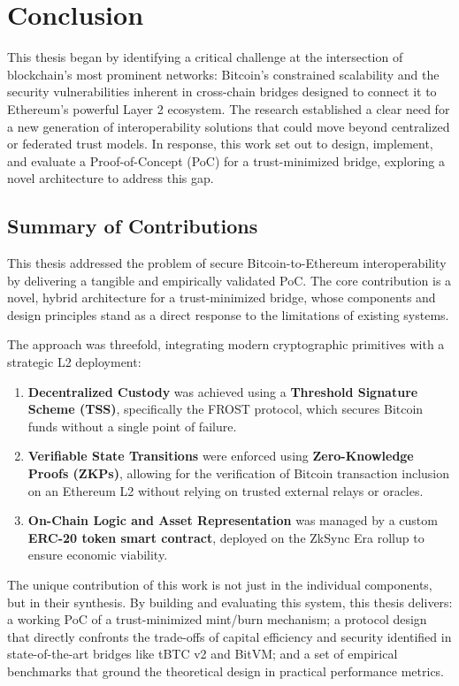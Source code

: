 \documentclass{DESSThesis}
\begin{document}
\chapter{Conclusion} \label{chap:conclusion}
\thispagestyle{empty}

This thesis began by identifying a critical challenge at the intersection of blockchain's most prominent networks: Bitcoin's constrained scalability and the security vulnerabilities inherent in cross-chain bridges designed to connect it to Ethereum's powerful Layer 2 ecosystem. The research established a clear need for a new generation of interoperability solutions that could move beyond centralized or federated trust models. In response, this work set out to design, implement, and evaluate a Proof-of-Concept (PoC) for a trust-minimized bridge, exploring a novel architecture to address this gap.

\section{Summary of Contributions}

This thesis addressed the problem of secure Bitcoin-to-Ethereum interoperability by delivering a tangible and empirically validated PoC. The core contribution is a novel, hybrid architecture for a trust-minimized bridge, whose components and design principles stand as a direct response to the limitations of existing systems.

The approach was threefold, integrating modern cryptographic primitives with a strategic L2 deployment:
\begin{enumerate}
    \item \textbf{Decentralized Custody} was achieved using a \textbf{Threshold Signature Scheme (TSS)}, specifically the FROST protocol, which secures Bitcoin funds without a single point of failure.
    \item \textbf{Verifiable State Transitions} were enforced using \textbf{Zero-Knowledge Proofs (ZKPs)}, allowing for the verification of Bitcoin transaction inclusion on an Ethereum L2 without relying on trusted external relays or oracles.
    \item \textbf{On-Chain Logic and Asset Representation} was managed by a custom \textbf{ERC-20 token smart contract}, deployed on the ZkSync Era rollup to ensure economic viability.
\end{enumerate}

The unique contribution of this work is not just in the individual components, but in their synthesis. By building and evaluating this system, this thesis delivers: a working PoC of a trust-minimized mint/burn mechanism; a protocol design that directly confronts the trade-offs of capital efficiency and security identified in state-of-the-art bridges like tBTC v2 and BitVM; and a set of empirical benchmarks that ground the theoretical design in practical performance metrics.
\end{document}
